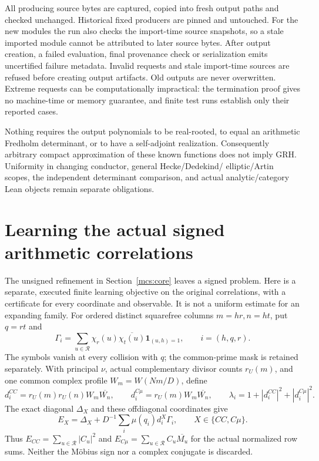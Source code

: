 \documentclass[11pt,oneside,openany]{book}
\theoremstyle{definition}\newtheorem{definition}[theorem]{Definition}
\theoremstyle{remark}\newtheorem{remark}[theorem]{Remark}
\begin{document}
All producing source bytes are captured, copied into fresh output paths and
checked unchanged. Historical fixed producers are pinned and untouched.
For the new modules the run also checks the import-time source snapshots,
so a stale imported module cannot be attributed to later source bytes.
After output creation, a failed evaluation, final provenance check or
serialization emits uncertified failure metadata. Invalid requests and stale
import-time sources are refused before creating output artifacts. Old
outputs are never overwritten. Extreme requests can be
computationally impractical: the termination proof gives no machine-time or
memory guarantee, and finite test runs establish only their reported cases.

Nothing requires the output polynomials to be real-rooted, to equal an
arithmetic Fredholm determinant, or to have a self-adjoint realization.
Consequently arbitrary compact approximation of these known functions does
not imply GRH. Uniformity in changing conductor, general Hecke/Dedekind/
elliptic/Artin scopes, the independent determinant comparison, and actual
analytic/category Lean objects remain separate obligations.

\section{Learning the actual signed arithmetic correlations}\label{arl:core}
The unsigned refinement in Section~\ref{mcs:core} leaves a signed problem.
Here is a separate, executed finite learning objective on the original
correlations, with a certificate for every coordinate and observable.
It is not a uniform estimate for an expanding family.
For ordered distinct squarefree columns $m=hr,n=ht$, put $q=rt$ and
\[
 \Gamma_i=\sum_{u\in\mathcal R}\chi_r(u)\overline{\chi_t(u)}
                         \mathbf1_{(u,h)=1},\qquad i=(h,q,r).
\]
The symbols vanish at every collision with $q$; the common-prime mask is
retained separately. With principal $\nu$, actual complementary divisor counts
$r_U(m)$, and one common complex profile $W_m=W(Nm/D)$, define
\[
 d_i^{CC}=r_U(m)r_U(n)W_m\overline{W_n},\qquad
 d_i^{C\mu}=r_U(m)W_m\overline{W_n},\qquad
 \lambda_i=1+|d_i^{CC}|^2+|d_i^{C\mu}|^2.
\]
The exact diagonal $\Delta_X$ and these offdiagonal coordinates give
\begin{equation}\label{arl:observable}
 E_X=\Delta_X+D^{-1}\sum_i\mu(q_i)d_i^X\Gamma_i,
       \qquad X\in\{CC,C\mu\}.
\end{equation}
Thus $E_{CC}=\sum_{u\in\mathcal R}|C_u|^2$ and
$E_{C\mu}=\sum_{u\in\mathcal R}C_u\overline{M_u}$ for the actual normalized
row sums. Neither the M\"obius sign nor a complex conjugate is discarded.
\end{document}

